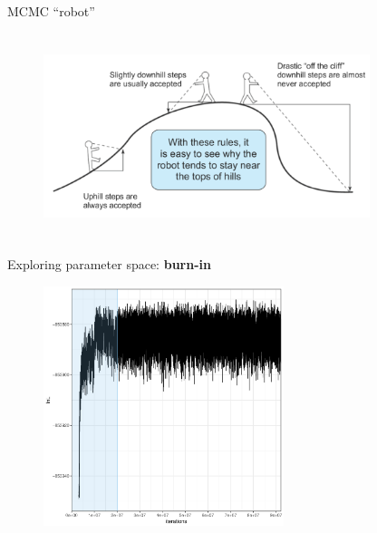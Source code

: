 \documentclass[newPxFont,numfooter,sectionpages]{beamer}
\begin{document}
\begin{frame}{MCMC ``robot''}
\begin{figure}
	\includegraphics[width=0.85\textwidth,height=6cm]{figures/robot.pdf} 
\end{figure}
\end{frame}

\begin{frame}{Exploring parameter space: \textbf{burn-in}}
\begin{figure}
	\includegraphics[width=\textwidth,height=7cm]{figures/burnin.pdf} 
\end{figure}
\end{frame}
\end{document}
